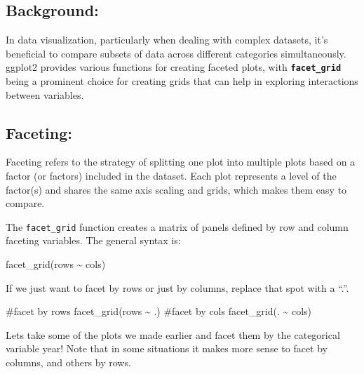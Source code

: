 \documentclass[
  letterpaper,
  DIV=11,
  numbers=noendperiod]{scrreprt}
\newenvironment{Shaded}{\begin{snugshade}}{\end{snugshade}}
\newcommand{\CommentTok}[1]{\textcolor[rgb]{0.37,0.37,0.37}{#1}}
\newcommand{\FunctionTok}[1]{\textcolor[rgb]{0.28,0.35,0.67}{#1}}
\newcommand{\NormalTok}[1]{\textcolor[rgb]{0.00,0.23,0.31}{#1}}
\newcommand{\SpecialCharTok}[1]{\textcolor[rgb]{0.37,0.37,0.37}{#1}}
\begin{document}
\hypertarget{background}{%
\subsection{Background:}\label{background}}

In data visualization, particularly when dealing with complex datasets,
it's beneficial to compare subsets of data across different categories
simultaneously. ggplot2 provides various functions for creating faceted
plots, with \textbf{\texttt{facet\_grid}} being a prominent choice for
creating grids that can help in exploring interactions between
variables.

\hypertarget{faceting}{%
\subsection{Faceting:}\label{faceting}}

Faceting refers to the strategy of splitting one plot into multiple
plots based on a factor (or factors) included in the dataset. Each plot
represents a level of the factor(s) and shares the same axis scaling and
grids, which makes them easy to compare.

The \texttt{facet\_grid} function creates a matrix of panels defined by
row and column faceting variables. The general syntax is:

\begin{Shaded}
\begin{Highlighting}[]
\FunctionTok{facet\_grid}\NormalTok{(rows }\SpecialCharTok{\textasciitilde{}}\NormalTok{ cols)}
\end{Highlighting}
\end{Shaded}

If we just want to facet by rows or just by columns, replace that spot
with a ``.''.

\begin{Shaded}
\begin{Highlighting}[]
\CommentTok{\#facet by rows}
\FunctionTok{facet\_grid}\NormalTok{(rows }\SpecialCharTok{\textasciitilde{}}\NormalTok{ .)}
\CommentTok{\#facet by cols}
\FunctionTok{facet\_grid}\NormalTok{(. }\SpecialCharTok{\textasciitilde{}}\NormalTok{ cols)}
\end{Highlighting}
\end{Shaded}

Lets take some of the plots we made earlier and facet them by the
categorical variable year! Note that in some situations it makes more
sense to facet by columns, and others by rows.
\end{document}
